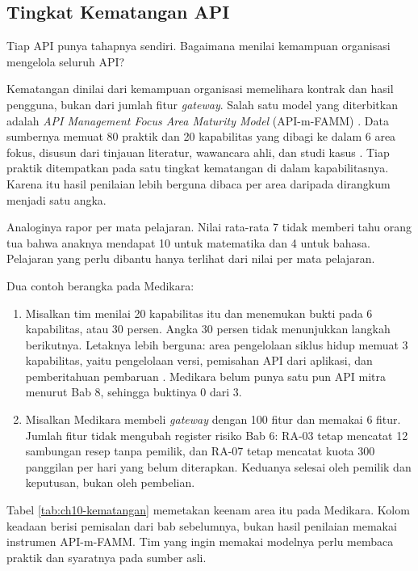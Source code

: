 \subsection{Tingkat Kematangan API}

Tiap API punya tahapnya sendiri. Bagaimana menilai kemampuan organisasi mengelola seluruh API?

Kematangan dinilai dari kemampuan organisasi memelihara kontrak dan hasil pengguna, bukan dari jumlah fitur
\textit{gateway}. Salah satu model yang diterbitkan adalah \textit{API Management Focus Area Maturity Model}
(API-m-FAMM) \cite{c10-overeem2022}. Data sumbernya memuat 80 praktik dan 20 kapabilitas yang dibagi ke dalam 6 area
fokus, disusun dari tinjauan literatur, wawancara ahli, dan studi kasus \cite{mathijssen2020}. Tiap praktik
ditempatkan pada satu tingkat kematangan di dalam kapabilitasnya. Karena itu hasil penilaian lebih berguna dibaca per
area daripada dirangkum menjadi satu angka.

Analoginya rapor per mata pelajaran. Nilai rata-rata 7 tidak memberi tahu orang tua bahwa anaknya mendapat 10 untuk
matematika dan 4 untuk bahasa. Pelajaran yang perlu dibantu hanya terlihat dari nilai per mata pelajaran.

Dua contoh berangka pada Medikara:
\begin{enumerate}
  \item Misalkan tim menilai 20 kapabilitas itu dan menemukan bukti pada 6 kapabilitas, atau 30 persen. Angka 30 persen
        tidak menunjukkan langkah berikutnya. Letaknya lebih berguna: area pengelolaan siklus hidup memuat 3
        kapabilitas, yaitu pengelolaan versi, pemisahan API dari aplikasi, dan pemberitahuan pembaruan
        \cite{mathijssen2020}. Medikara belum punya satu pun API mitra menurut Bab 8, sehingga buktinya 0 dari 3.
  \item Misalkan Medikara membeli \textit{gateway} dengan 100 fitur dan memakai 6 fitur. Jumlah fitur tidak mengubah
        register risiko Bab 6: RA-03 tetap mencatat 12 sambungan resep tanpa pemilik, dan RA-07 tetap mencatat kuota 300
        panggilan per hari yang belum diterapkan. Keduanya selesai oleh pemilik dan keputusan, bukan oleh pembelian.
\end{enumerate}

Tabel \ref{tab:ch10-kematangan} memetakan keenam area itu pada Medikara. Kolom keadaan berisi pemisalan dari bab
sebelumnya, bukan hasil penilaian memakai instrumen API-m-FAMM. Tim yang ingin memakai modelnya perlu membaca praktik
dan syaratnya pada sumber asli.

